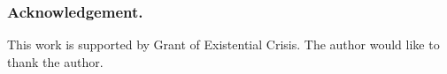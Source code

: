 \subsubsection{Acknowledgement.}
This work is supported by {\color{red}Grant of Existential Crisis}.
The author would like to thank the author.
